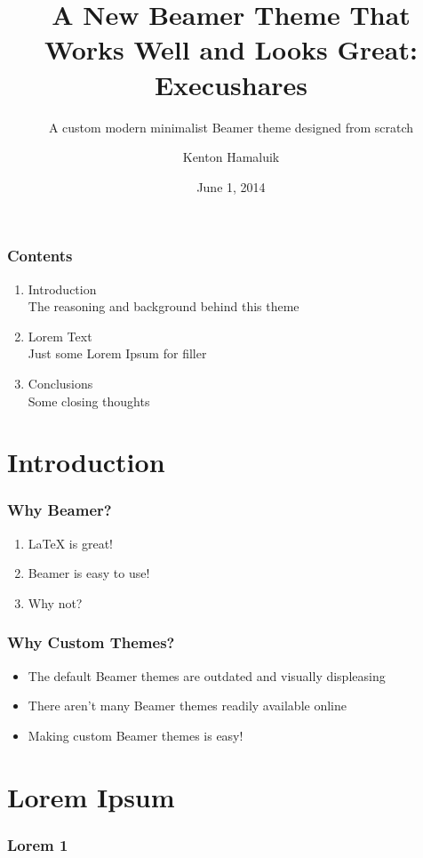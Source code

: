 \documentclass[xcolor={table}]{beamer}
\title{A New Beamer Theme That Works Well and Looks Great: Execushares}
\subtitle{A custom modern minimalist Beamer theme designed from scratch}
\author{Kenton Hamaluik}
\date{June 1, 2014}
\begin{document}
	\setcounter{showProgressBar}{0}
	\setcounter{showSlideNumbers}{0}

	\frame{\titlepage}

	\begin{frame}
		\frametitle{Contents}
		\begin{enumerate}
			\item Introduction \\ \textcolor{ExecusharesGrey}{\footnotesize\hspace{1em} The reasoning and background behind this theme}
			\item Lorem Text  \\ \textcolor{ExecusharesGrey}{\footnotesize\hspace{1em} Just some Lorem Ipsum for filler}
			\item Conclusions \\ \textcolor{ExecusharesGrey}{\footnotesize\hspace{1em} Some closing thoughts}
		\end{enumerate}
	\end{frame}

	\setcounter{framenumber}{0}
	\setcounter{showProgressBar}{1}
	\setcounter{showSlideNumbers}{1}
	\section{Introduction}
		\begin{frame}
			\frametitle{Why Beamer?}
			\begin{enumerate}
				\item LaTeX is great!
				\item Beamer is easy to use!
				\item Why not?
			\end{enumerate}
		\end{frame}

		\begin{frame}
			\frametitle{Why Custom Themes?}
			\begin{itemize}
				\item The default Beamer themes are outdated and visually displeasing
				\item There aren't many Beamer themes readily available online
				\item Making custom Beamer themes is easy!
			\end{itemize}
		\end{frame}

	\section{Lorem Ipsum}
		\begin{frame}
			\frametitle{Lorem 1}
		\end{frame}
\end{document}
